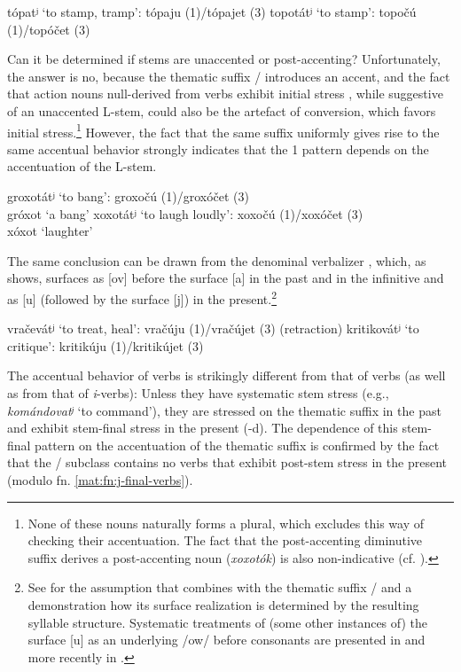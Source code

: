 \documentclass[output=paper,colorlinks,citecolor=black,koreanfont]{langscibook}
\begin{document}
\ea 
\ea\label{mat:ex:topat} tópatʲ ‘to stamp, tramp’: tópaju ({1\SG})/tópajet ({3\SG})
\ex\label{mat:ex:topotat} topotátʲ ‘to stamp’: topočú ({1\SG})/topóčet ({3\SG})
\z
\z

\largerpage
\noindent Can it be determined if  stems are unaccented or post-accenting? Unfortunately, the answer is no, because the thematic suffix / introduces an accent, and the fact that action nouns null-derived from  verbs exhibit initial stress , while suggestive of an unaccented L-stem, could also be the artefact of conversion, which favors initial stress.\footnote{None of these nouns naturally forms a plural, which excludes this way of checking their accentuation. The fact that the post-accenting diminutive suffix  derives a post-accenting noun (\textit{xoxotók}) is also non-indicative (cf. \citealt[340]{Halle1973}).} However, the fact that the same suffix uniformly gives rise to the same accentual behavior strongly indicates that the {1\SG} pattern depends on the accentuation of the L-stem.

\ea\label{mat:ex:groxotatxoxotat} 
\ea\label{mat:ex:groxotat} groxotátʲ ‘to bang’: groxočú ({1\SG})/groxóčet ({3\SG}) \\gróxot ‘a bang’
\ex\label{mat:ex:xoxotat} xoxotátʲ ‘to laugh loudly’: xoxočú ({1\SG})/xoxóčet ({3\SG}) \\xóxot ‘laughter’
\z
\z

\noindent The same conclusion can be drawn from the denominal verbalizer , which, as  shows, surfaces as [ov] before the surface [a] in the past and in the infinitive and as [u] (followed by the surface [j]) in the present.\footnote{See \citet{Melvold1989} for the assumption that  combines with the thematic suffix / and a demonstration how its surface realization is determined by the resulting syllable structure. Systematic treatments of (some other instances of) the surface [u] as an underlying /ow/ before consonants are presented in \citet{Lightner1965} and more recently in \citet[147--148]{Itkin2007}.}

\ea\label{mat:ex:vracevatkritikovat} 
\ea\label{mat:ex:vracevat} vračevátʲ ‘to treat, heal’: vračúju ({1\SG})/vračújet ({3\SG}) \hfill (retraction)
\ex\label{mat:ex:kritikovat} kritikovátʲ ‘to critique’: kritikúju ({1\SG})/kritikújet ({3\SG})
\z
\z

\noindent The accentual behavior of  verbs is strikingly different from that of  verbs (as well as from that of \textit{i}-verbs): Unless they have systematic stem stress (e.g., \textit{komándovatʲ} ‘to command’), they are stressed on the thematic suffix in the past and exhibit stem-final stress in the present (-d). The dependence of this stem-final pattern on the accentuation of the thematic suffix is confirmed by the fact that the / subclass contains no verbs that exhibit post-stem stress in the present (modulo fn. \ref{mat:fn:j-final-verbs}).
\end{document}
